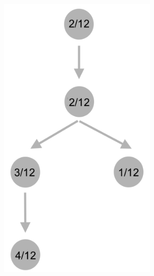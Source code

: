 \documentclass{article}
\begin{document}
\begin{figure}[h]
	\centering
	\begin{subfigure}[t]{0.18\linewidth}
		\centering
		\includegraphics[width = 1.0\linewidth, trim={0 0 0 0}, clip=true]{tree1.png}
		\label{fig:tree1}	
	\end{subfigure}%
	\hspace{0.15 \linewidth}

\end{figure}
\end{document}
